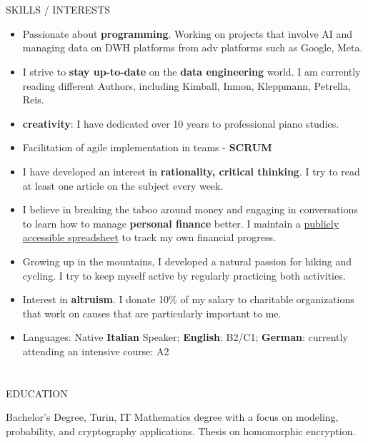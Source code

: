 \documentclass{my_cv}
\begin{document}
\begin{multicols}{2}
\section{\faPaintBrush}{SKILLS / INTERESTS}
\begin{itemize}[noitemsep]
    \item Passionate about \textbf{programming}. Working on projects that involve AI and managing data on DWH platforms from adv platforms such as Google, Meta.
    \item I strive to \textbf{stay up-to-date} on the \textbf{data engineering} world. I am currently reading different Authors, including Kimball, Inmon, Kleppmann, Petrella, Reis.
    \item \textbf{creativity}: I have dedicated over 10 years to professional piano studies.
    \item Facilitation of agile implementation in teams - \textbf{SCRUM}
    \item I have developed an interest in \textbf{rationality, critical thinking}. I try to read at least one article on the subject every week.
    \item I believe in breaking the taboo around money and engaging in conversations to learn how to manage \textbf{personal finance} better. I maintain a \href{https://docs.google.com/spreadsheets/d/1G_CqV95lI7r-XtgpO5UOzsB_h77G4JVV9kThdzfsujk/edit?usp=sharing}{publicly accessible spreadsheet} to track my own financial progress.
    \item Growing up in the mountains, I developed a natural passion for hiking and cycling. I try to keep myself active by regularly practicing both activities.
    \item Interest in \textbf{altruism}. I donate 10\% of my salary to charitable organizations that work on causes that are particularly important to me.
    \item Languages: Native \textbf{Italian} Speaker; \textbf{English}: B2/C1; \textbf{German}: currently attending an intensive course: A2 
\end{itemize}

\section{\faGraduationCap}{EDUCATION}
    
{Bachelor's Degree, Turin, IT} %
{Mathematics degree with a focus on modeling, probability, and cryptography applications. Thesis on homomorphic encryption.}
    
{}
{}


\end{multicols}
\end{document}
